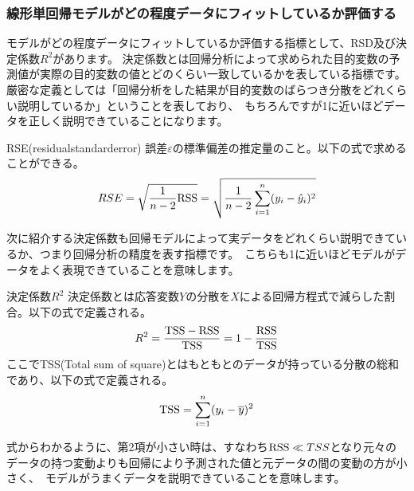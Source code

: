 \documentclass[uplatex]{jsarticle}
\begin{document}
\subsubsection{線形単回帰モデルがどの程度データにフィットしているか評価する}
モデルがどの程度データにフィットしているか評価する指標として、RSD及び決定係数$R^2$があります。
決定係数とは回帰分析によって求められた目的変数の予測値が実際の目的変数の値とどのくらい一致しているかを表している指標です。厳密な定義としては「回帰分析をした結果が目的変数のばらつき分散をどれくらい説明しているか」ということを表しており、\
もちろんですが1に近いほどデータを正しく説明できていることになります。
\begin{itembox}[l]{RSE(residualstandarderror)}
  誤差$\varepsilon$の標準偏差の推定量のこと。以下の式で求めることができる。
  $$RSE = \sqrt{\frac{1}{n-2}{\rm RSS}} = \sqrt{\frac{1}{n-2}\sum_{i=1}^n(y_i - \hat{y}_i)^2}$$
\end{itembox}
次に紹介する決定係数も回帰モデルによって実データをどれくらい説明できているか、つまり回帰分析の精度を表す指標です。\
こちらも1に近いほどモデルがデータをよく表現できていることを意味します。
\begin{itembox}[l]{決定係数$R^2$}
  決定係数とは応答変数$Y$の分散を$X$による回帰方程式で減らした割合。以下の式で定義される。
  $$R^2 = \frac{{\rm TSS} - {\rm RSS}}{{\rm TSS}} = 1 - \frac{{\rm RSS}}{{\rm TSS}}$$
  ここでTSS(Total sum of square)とはもともとのデータが持っている分散の総和であり、以下の式で定義される。
  $${\rm TSS} = \sum_{i=1}^n (y_i - \overline{y})^2$$
\end{itembox}
式からわかるように、第2項が小さい時は、すなわち${\rm RSS} \ll TSS$となり元々のデータの持つ変動よりも回帰により予測された値と元データの間の変動の方が小さく、\
モデルがうまくデータを説明できていることを意味します。
\end{document}
